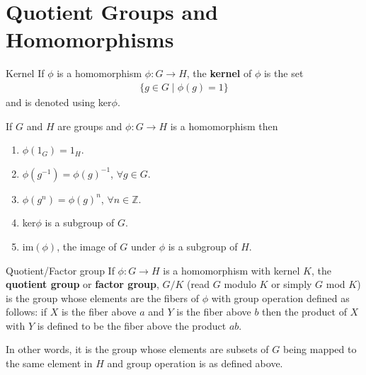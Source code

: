 \documentclass[titlepage, 12pt]{book}
\begin{document}
\chapter{Quotient Groups and Homomorphisms}

\begin{definition}{Kernel}{}
    If $\phi$ is a homomorphism $\phi:G\rightarrow H$, the \textbf{kernel} of
    $\phi$ is the set
    \begin{gather*}
        \{g\in G\mid\phi(g) = 1\}
    \end{gather*}
    and is denoted using ker$\phi$.
\end{definition}
If $G$ and $H$ are groups and $\phi:G\rightarrow H$ is a homomorphism
then
\begin{enumerate}
    \item$\phi(1_G) = 1_H$.
    \item$\phi(g^{-1}) = \phi(g)^{-1}$, $\forall g\in G$.
    \item$\phi(g^n) = \phi(g)^n$, $\forall n\in\mathbb{Z}$.
    \item ker$\phi$ is a subgroup of $G$.
    \item im$(\phi)$, the image of $G$ under $\phi$ is a subgroup of $H$.
\end{enumerate}

\begin{definition}{Quotient/Factor group}{}
    If $\phi:G\rightarrow H$ is a homomorphism with kernel $K$, the
    \textbf{quotient group} or \textbf{factor group}, $G/K$ (read $G$ modulo $K$
    or simply $G$ mod $K$) is the group whose elements are the fibers of $\phi$
    with group operation defined as follows: if $X$ is the fiber above $a$ and
    $Y$ is the fiber above $b$ then the product of $X$ with $Y$ is defined to be
    the fiber above the product $ab$.
\end{definition}
In other words, it is the group whose elements are subsets of $G$ being mapped
to the same element in $H$ and group operation is as defined above.
\end{document}
